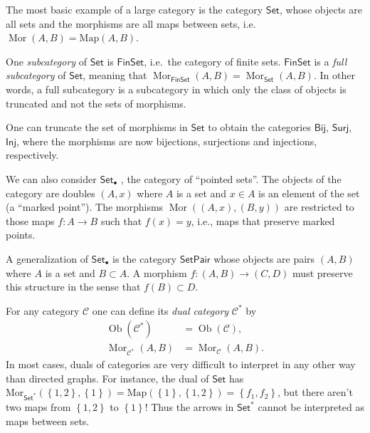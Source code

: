 \documentclass[english,letterpaper]{article}%
\numberwithin{equation}{section}
\numberwithin{figure}{section}
\numberwithin{table}{section}
\theoremstyle{definition}
\theoremstyle{definition}
\theoremstyle{definition}
\theoremstyle{plain}
\theoremstyle{plain}
\theoremstyle{plain}
\theoremstyle{plain}
\theoremstyle{remark}
\theoremstyle{remark}
\DeclareMathOperator{\mor}{Mor}
\DeclareMathOperator{\ob}{Ob}
\begin{document}
\begin{example}
The most basic example of a large category is the category $\mathsf{Set}$,
whose objects are all sets and the morphisms are all maps between
sets, i.e.\ $\mor\left(A,B\right)=\mathrm{Map}\left(A,B\right)$. 

One \emph{subcategory} of $\mathsf{Set}$ is $\mathsf{FinSet}$,
i.e.\ the category of finite sets. $\mathsf{FinSet}$ is a \emph{full
subcategory} of $\mathsf{Set}$, meaning that $\mor_{\mathsf{FinSet}}(A,B)=\mor_{\mathsf{Set}}(A,B)$.
In other words, a full subcategory is a subcategory in which only
the class of objects is truncated and not the sets of morphisms.
\end{example}
%
\begin{example}
One can truncate the set of morphisms in $\mathsf{Set}$ to obtain
the categories $\mathsf{Bij}$, $\mathsf{Surj}$, $\mathsf{Inj}$,
where the morphisms are now bijections, surjections and injections,
respectively.
\end{example}
%
\begin{example}
We can also consider $\mathsf{Set}_{\bullet}$ , the category of ``pointed
sets''. The objects of the category are doubles $(A,x)$ where $A$
is a set and $x\in A$ is an element of the set (a ``marked point'').
The morphisms $\mor((A,x),(B,y))$ are restricted to those maps $f:A\rightarrow B$
such that $f(x)=y$, i.e., maps that preserve marked points.
\end{example}
%
\begin{example}
A generalization of $\mathsf{Set}_{\bullet}$ is the category $\mathsf{SetPair}$
whose objects are pairs $(A,B)$ where $A$ is a set and $B\subset A$.
A morphism $f:(A,B)\rightarrow(C,D)$ must preserve this structure
in the sense that $f(B)\subset D$.
\end{example}
%
\begin{example}
For any category $\mathcal{C}$ one can define its \emph{dual category}
$\mathcal{C}^{\ast}$ by
\begin{align}
\ob\left(\mathcal{C}^{\ast}\right) & =\ob\left(\mathcal{C}\right),\nonumber \\
\mor_{\mathcal{C}^{\ast}}\left(A,B\right) & =\mor_{\mathcal{C}}\left(A,B\right).
\end{align}
In most cases, duals of categories are very difficult to interpret
in any other way than directed graphs. For instance, the dual of $\mathsf{Set}$
has $\mathrm{Mor}_{\mathsf{Set}^{\ast}}\left(\left\{ 1,2\right\} ,\left\{ 1\right\} \right)=\mathrm{Map}\left(\left\{ 1\right\} ,\left\{ 1,2\right\} \right)=\left\{ f_{1},f_{2}\right\} $,
but there aren't two maps from $\left\{ 1,2\right\} $ to $\left\{ 1\right\} $!
Thus the arrows in $\mathsf{Set}^{\ast}$ cannot be interpreted as
maps between sets.
\end{example}
\end{document}
